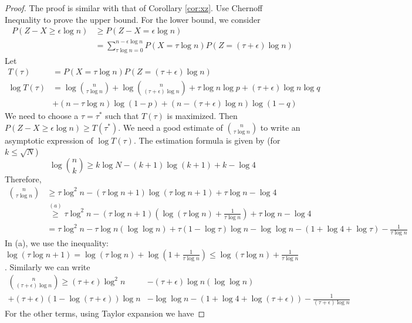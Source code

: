 \documentclass{article}
\begin{document}
\begin{proof}
	The proof is similar with that of Corollary \ref{cor:xz}.
	Use Chernoff Inequality to prove the upper bound. For the lower bound, we consider
	\begin{align*}
	P(Z - X \geq \epsilon \log n) & \geq P(Z - X = \epsilon \log n) \\
	& = \sum_{\tau \log n = 0}^{n - \epsilon \log n} P(X = \tau \log n) P(Z = (\tau + \epsilon) \log n)
	\end{align*}
	Let
	\begin{align*}
	T(\tau) &= P(X = \tau \log n) P(Z = (\tau + \epsilon) \log n) \\ 
	\log T(\tau) & = \log \binom{n}{\tau \log n} +  \log \binom{n}{(\tau + \epsilon) \log n}
    +  \tau \log n \log p + (\tau + \epsilon) \log n \log q \\
    &+ (n - \tau \log n) \log (1 - p)
    + (n - (\tau + \epsilon) \log n ) \log (1 - q )
	\end{align*}
	We need to choose a $\tau=\tau^*$ such that $T(\tau)$ is maximized. Then
	$ P(Z - X \geq \epsilon \log n) \geq T(\tau^*)$.
	We need a good estimate of $\binom{n}{\tau \log n}$ to write an asymptotic expression of $\log T(\tau)$.
	The estimation formula is given by (for $k\leq \sqrt{N}$)
	$$
	\log \binom{n}{k} \geq k \log N - (k+1) \log (k+1) + k - \log 4
	$$
	Therefore,
	\begin{align*}
	\binom{n}{\tau \log n} &\geq \tau \log^2 n - (\tau \log n + 1)\log(\tau \log n + 1) + \tau \log n  - \log 4 \\
	&\stackrel{(a)}{\geq}  \tau \log^2 n - (\tau \log n + 1)(\log(\tau \log n) + \frac{1}{\tau \log n}) + \tau \log n  - \log 4 \\
	& = \tau \log^2 n - 
	\tau \log n(\log\log n) + \tau (  1 - \log \tau)\log n - \log\log n- (1 + \log 4 + \log \tau) -\frac{1}{\tau \log n}
	\end{align*}
	In (a), we use the inequality:
	$\log(\tau\log n + 1) = \log(\tau\log n) + \log(1+\frac{1}{\tau \log n})
	\leq \log(\tau\log n) + \frac{1}{\tau \log n}$.
	Similarly we can write
	\begin{align*}
	\binom{n}{(\tau + \epsilon) \log n} \geq
	(\tau + \epsilon) \log^2 n&
	-(\tau + \epsilon) \log n(\log\log n) \\
	+ (\tau + \epsilon) (1-\log (\tau + \epsilon) )\log n &- \log\log n 
	- (1 + \log 4 + \log (\tau+\epsilon)) 
	-\frac{1}{(\tau + \epsilon)\log n}
	\end{align*}
	For the other terms, using Taylor expansion we have

\end{proof}
\end{document}

